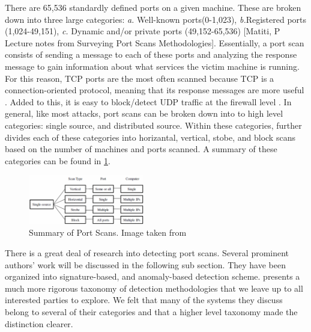 \documentclass{acm_proc_article-sp}
\begin{document}
	 There are 65,536 standardly defined ports on a given machine. These are broken down into three large categories: \emph{a.} Well-known ports(0-1,023), \emph{b.}Registered ports (1,024-49,151), \emph{c.} Dynamic and/or private ports (49,152-65,536) [Matiti, P Lecture notes from Surveying Port Scans Methodologies]. %
Essentially, a port scan consists of sending a message to each of these ports and analyzing the response message to gain information about what services the victim machine is running. For this reason, TCP ports are the most often scanned because TCP is a connection-oriented protocol, meaning that its response messages are more useful \cite{SilenokElena;RoedelChris;Silenok}. Added to this, it is easy to block/detect UDP traffic at the firewall level \cite{Bhuyan2011}. In general, like most attacks, port scans can be broken down into to high level categories: single source, and distributed source. Within these categories, \cite{Staniford2002} further divides each of these categories into horizantal, vertical, stobe, and block scans based on the number of machines and ports scanned. A summary of these categories can be found in \ref{portScans}.
	\begin{figure}[h!]
		\centering
		\includegraphics[width=0.45\textwidth]{portScans.png}
		\caption{Summary of Port Scans. Image taken from \cite{Bhuyan2011}}
		\label{portScans}
	\end{figure}
	
	There is a great deal of research into detecting port scans. Several prominent authors' work will be discussed in the following sub section. They have been organized into signature-based, and anomaly-based detection scheme. \cite{Bhuyan2011} presents a much more rigorous taxonomy of detection methodologies that we leave up to all interested parties to explore. We felt that many of the systems they discuss belong to several of their categories and that a higher level taxonomy made the distinction clearer. 
\end{document}
